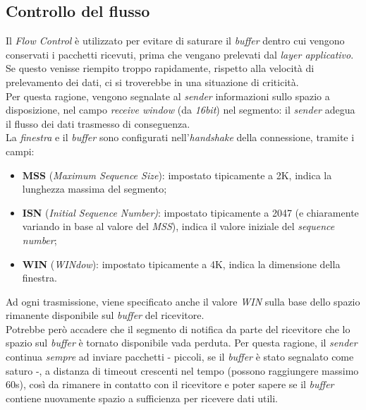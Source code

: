 \subsection{Controllo del flusso}
Il \textit{Flow Control} è utilizzato per evitare di saturare il \textit{buffer} dentro cui vengono conservati i pacchetti ricevuti, prima che vengano prelevati dal \textit{layer applicativo}. Se questo venisse riempito troppo rapidamente, rispetto alla velocità di prelevamento dei dati, ci si troverebbe in una situazione di criticità. \\
Per questa ragione, vengono segnalate al \textit{sender} informazioni sullo spazio a disposizione, nel campo \textit{receive window} (da \textit{16bit}) nel segmento: il \textit{sender} adegua il flusso dei dati trasmesso di conseguenza. \\
La \textit{finestra} e il \textit{buffer} sono configurati nell'\textit{handshake} della connessione, tramite i campi:
\begin{itemize}
    \item \textbf{MSS} (\textit{Maximum Sequence Size}): impostato tipicamente a 2K, indica la lunghezza massima del segmento;
    \item \textbf{ISN} (\textit{Initial Sequence Number)}: impostato tipicamente a 2047 (e chiaramente variando in base al valore del \textit{MSS}), indica il valore iniziale del \textit{sequence number};
    \item \textbf{WIN} (\textit{WINdow}): impostato tipicamente a 4K, indica la dimensione della finestra.
\end{itemize}
Ad ogni trasmissione, viene specificato anche il valore \textit{WIN} sulla base dello spazio rimanente disponibile sul \textit{buffer} del ricevitore. \\
Potrebbe però accadere che il segmento di notifica da parte del ricevitore che lo spazio sul \textit{buffer} è tornato disponibile vada perduta. Per questa ragione, il \textit{sender} continua \textit{sempre} ad inviare pacchetti - piccoli, se il \textit{buffer} è stato segnalato come saturo -, a distanza di timeout crescenti nel tempo (possono raggiungere massimo 60s), così da rimanere in contatto con il ricevitore e poter sapere se il \textit{buffer} contiene nuovamente spazio a sufficienza per ricevere dati utili.